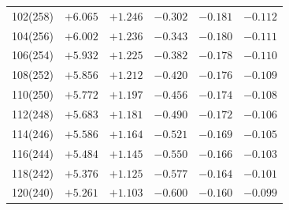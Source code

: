 \begin{table}[!h]
\begin{tabular}{rrrrrr}
102(258) & $+6.065$ & $+1.246$ & $-0.302$ & $-0.181$ & $-0.112$\\ 
104(256) & $+6.002$ & $+1.236$ & $-0.343$ & $-0.180$ & $-0.111$\\
106(254) & $+5.932$ & $+1.225$ & $-0.382$ & $-0.178$ & $-0.110$\\
108(252) & $+5.856$ & $+1.212$ & $-0.420$ & $-0.176$ & $-0.109$\\
110(250) & $+5.772$ & $+1.197$ & $-0.456$ & $-0.174$ & $-0.108$\\
112(248) & $+5.683$ & $+1.181$ & $-0.490$ & $-0.172$ & $-0.106$\\
114(246) & $+5.586$ & $+1.164$ & $-0.521$ & $-0.169$ & $-0.105$\\
116(244) & $+5.484$ & $+1.145$ & $-0.550$ & $-0.166$ & $-0.103$\\
118(242) & $+5.376$ & $+1.125$ & $-0.577$ & $-0.164$ & $-0.101$\\
120(240) & $+5.261$ & $+1.103$ & $-0.600$ & $-0.160$ & $-0.099$\\
\end{tabular}
\end{table}

